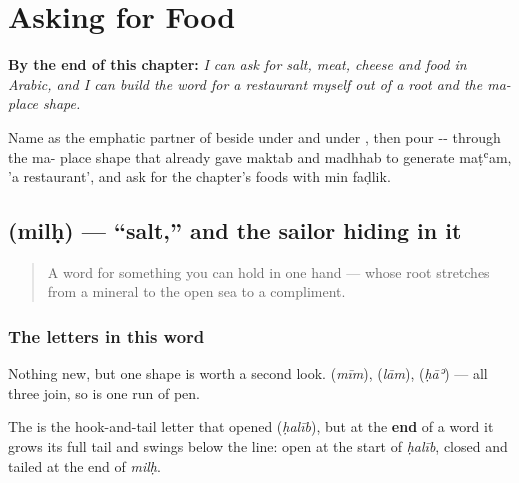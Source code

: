 
\chapter{Asking for Food}
\label{ch:ar-asking-for-food}

\begin{chapteropening}
\textbf{By the end of this chapter:} \emph{I can ask for salt, meat, cheese and food in Arabic, and I can build the word for a restaurant myself out of a root and the ma- place shape.}

Name  as the emphatic partner of  beside  under  and  under , then pour -- through the ma- place shape that already gave maktab and madhhab to generate maṭʿam, 'a restaurant', and ask for the chapter's foods with min faḍlik.
\end{chapteropening}

\section[\texorpdfstring{\ar{ملح} (milḥ)}{ملح (milḥ)}]{ (milḥ) — \textquotedblleft{}salt,\textquotedblright{} and the sailor hiding in it}

\label{lesson:AR-C34-milh}



\begin{quote}
A word for something you can hold in one hand — whose root stretches from a mineral to the open sea to a compliment.
\end{quote}

\subsection*{The letters in this word}
Nothing new, but one shape is worth a second look. \textbf{} (\emph{mīm}), \textbf{} (\emph{lām}), \textbf{} (\emph{ḥāʾ}) — all three join, so \textbf{} is one run of pen.

The \textbf{} is the hook-and-tail letter that opened \textbf{} (\emph{ḥalīb}), but at the \textbf{end} of a word it grows its full tail and swings below the line: open at the start of \emph{ḥalīb}, closed and tailed at the end of \emph{milḥ}.

